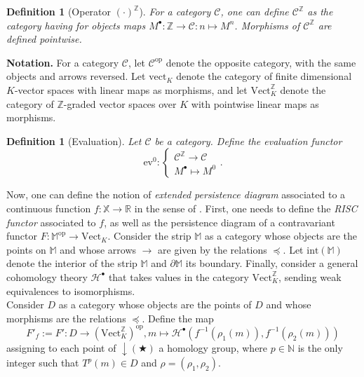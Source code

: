\documentclass[11pt]{article}
\newtheorem{definition}[theorem]{Definition}
\theoremstyle{remark}
\newcommand{\Z}{\mathbb{Z}}
\newcommand{\N}{\mathbb{N}}
\newcommand{\R}{\mathbb{R}}
\newcommand{\X}{\mathbb{X}}
\newcommand{\M}{\mathbb{M}}
\begin{document}
\begin{definition}[Operator $(\cdot)^\Z$]
For a category $\mathcal{C}$, one can define $\mathcal{C}^\Z$ as the category having for objects maps $M^\bullet:\Z\rightarrow\mathcal{C}:n\mapsto M^n$. Morphisms of $\mathcal{C}^\Z$ are  defined pointwise.
\end{definition}

\noindent \textbf{Notation.} For a category $\mathcal{C}$, let $\mathcal{C}^{\mathrm{op}}$ denote the opposite category, with the same objects and arrows reversed. Let $\mathrm{vect}_K$ denote the category of finite dimensional $K$-vector spaces with linear maps as morphisms, and let $\mathrm{Vect}_K^\Z$ denote the category of $\Z$-graded vector spaces over $K$ with pointwise linear maps as morphisms.

\begin{definition}[Evaluation]
Let $\mathcal{C}$ be a category. Define the \emph{evaluation functor} \begin{equation*}
    \mathrm{ev}^0: 
    \begin{cases}
    \mathcal{C}^\Z\rightarrow \mathcal{C}\\
    M^\bullet\mapsto M^0
    \end{cases}.
\end{equation*}
\end{definition}

\noindent Now, one can define the notion of \textit{extended persistence diagram} associated to a continuous function $f:\X\rightarrow\R$ in the sense of  \cite{bauer2021structure}. First, one needs to define the \textit{RISC functor} associated to $f$, as well as the persistence diagram of a contravariant functor $F:\M^{\mathrm{op}}\rightarrow \mathrm{Vect}_K$. Consider the strip $\M$ as a category whose objects are the points on $\M$ and whose arrows $\rightarrow$ are given by the relations $\preceq$. Let $\mathrm{int}(\M)$ denote the interior of the strip $\M$ and $\partial\M$ its boundary. Finally, consider a general cohomology theory $\mathcal{H}^\bullet$ that takes values in the category $\mathrm{Vect}_K^\Z$, sending weak equivalences to isomorphisms.\\

\noindent Consider $D$ as a category whose objects are the points of $D$ and whose morphisms are the relations $\preceq$. Define the map  $$F'_f:=F':D\rightarrow \left (\mathrm{Vect}_K^\Z\right )^{\mathrm{op}}, m\mapsto \mathcal{H}^\bullet(f^{-1}(\rho_1(m)),f^{-1}(\rho_2(m)))$$ assigning to each point of $\downarrow(\bigstar)$ a homology group, where $p\in\N$ is the only integer such that $T^p(m)\in D$ and $\rho=(\rho_1,\rho_2)$.\\
\end{document}
